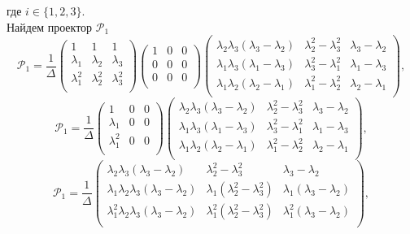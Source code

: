 где $i \in \{1,2,3\}$. \\
Найдем проектор $\mathcal{P}_1$
$$
\mathcal{P}_1 = 
\frac{1}{\Delta}
\begin{pmatrix}
  	1 & 1 & 1\\
  	\lambda_1 & \lambda_2 & \lambda_3 \\
  	\lambda_1^2 & \lambda_2^2 & \lambda_3^2 \\
 \end{pmatrix}
\begin{pmatrix}
  	1 & 0 & 0\\
  	0 & 0 & 0\\
  	0 & 0 & 0 \\
 \end{pmatrix}
\begin{pmatrix}
  	\lambda_2\lambda_3(\lambda_3-\lambda_2) & \lambda_2^2-\lambda_3^2 & \lambda_3-\lambda_2\\
  	\lambda_1\lambda_3(\lambda_1-\lambda_3) & \lambda_3^2-\lambda_1^2 & \lambda_1-\lambda_3\\
  	\lambda_1\lambda_2(\lambda_2-\lambda_1) & \lambda_1^2-\lambda_2^2 & \lambda_2-\lambda_1\\
 \end{pmatrix},
$$
$$
\mathcal{P}_1 = 
\frac{1}{\Delta}
\begin{pmatrix}
  	1 & 0 & 0\\
  	\lambda_1 & 0 & 0 \\
  	\lambda_1^2 & 0 & 0 \\
 \end{pmatrix}
\begin{pmatrix}
  	\lambda_2\lambda_3(\lambda_3-\lambda_2) & \lambda_2^2-\lambda_3^2 & \lambda_3-\lambda_2\\
  	\lambda_1\lambda_3(\lambda_1-\lambda_3) & \lambda_3^2-\lambda_1^2 & \lambda_1-\lambda_3\\
  	\lambda_1\lambda_2(\lambda_2-\lambda_1) & \lambda_1^2-\lambda_2^2 & \lambda_2-\lambda_1\\
 \end{pmatrix},
$$
$$
\mathcal{P}_1 = 
\frac{1}{\Delta}
\begin{pmatrix}
  	\lambda_2\lambda_3(\lambda_3-\lambda_2) & \lambda_2^2-\lambda_3^2 & \lambda_3-\lambda_2\\
  	\lambda_1\lambda_2\lambda_3(\lambda_3-\lambda_2) & \lambda_1\left(\lambda_2^2-\lambda_3^2\right) & \lambda_1\left(\lambda_3-\lambda_2\right)\\
  	\lambda_1^2\lambda_2\lambda_3(\lambda_3-\lambda_2) & \lambda_1^2\left(\lambda_2^2-\lambda_3^2\right) & \lambda_1^2\left(\lambda_3-\lambda_2\right)\\
 \end{pmatrix},
$$
